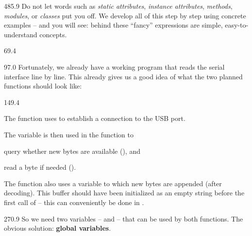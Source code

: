 \documentclass{aslab}
\begin{document}
\begin{region}[pitch=13.75]{485.9}
Do not let words such as \emph{static attributes}, \emph{instance
attributes}, \emph{methods}, \emph{modules}, or \emph{classes} put you off.
We develop all of this step by step using concrete examples -- and you will
see: behind these ``fancy'' expressions are simple, easy-to-understand
concepts.
\end{region}

\nextpage
\begin{region}{69.4}
\end{region}

\begin{region}[pitch=13.2]{97.0}
Fortunately, we already have a working program that reads the serial
interface line by line. This already gives us a good idea of what the two
planned functions should look like:
\end{region}

\begin{region}[pitch=13.54]{149.4}
\begin{dashlist}
\item The function  uses  to
  establish a connection to the USB port.
\item The variable  is then used in the function 
  to
  \begin{dashlist}
  \item query whether new bytes are available
    (), and
  \item read a byte if needed ().
  \end{dashlist}
\item The function  also uses a variable  to
  which new bytes are appended (after decoding). This buffer should have
  been initialized as an empty string before the first call of
   -- this can conveniently be done in .
\end{dashlist}
\end{region}

\begin{region}[pitch=14.2]{270.9}
So we need two variables --  and  -- that can be used
by both functions. The obvious solution: \textbf{global variables}.
\end{region}
\end{document}
